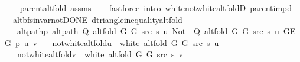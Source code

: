 \begin{isabellebody}
\endisataginvisible
{\isafoldinvisible}%
%
\isadeliminvisible
\isanewline
%
\endisadeliminvisible
%
\isadelimproof
\ \ %
\endisadelimproof
%
\isatagproof
{}\isamarkupfalse%
\ parent{\isacharunderscore}{\kern0pt}alt{\isacharunderscore}{\kern0pt}fold\ assms\isanewline
\ \ \isamarkupfalse%
\ {\isacharparenleft}{\kern0pt}fastforce\ intro{\isacharcolon}{\kern0pt}\ white{\isacharunderscore}{\kern0pt}not{\isacharunderscore}{\kern0pt}white{\isacharunderscore}{\kern0pt}alt{\isacharunderscore}{\kern0pt}foldD{\isacharparenleft}{\kern0pt}{}{\isacharparenright}{\kern0pt}\ parent{\isacharunderscore}{\kern0pt}imp{\isacharunderscore}{\kern0pt}d{\isacharparenright}{\kern0pt}%
\endisatagproof
{\isafoldproof}%
%
\isadelimproof
\isanewline
%
\endisadelimproof
\isanewline
{}\isamarkupfalse%
\ {\isacharparenleft}{\kern0pt}\ alt{\isacharunderscore}{\kern0pt}bfs{\isacharunderscore}{\kern0pt}invar{\isacharunderscore}{\kern0pt}not{\isacharunderscore}{\kern0pt}DONE{\isacharparenright}{\kern0pt}\ d{\isacharunderscore}{\kern0pt}triangle{\isacharunderscore}{\kern0pt}inequality{\isacharunderscore}{\kern0pt}alt{\isacharunderscore}{\kern0pt}fold{\isacharcolon}{\kern0pt}\isanewline
\ \ \ alt{\isacharunderscore}{\kern0pt}path{\isacharunderscore}{\kern0pt}p{\isacharcolon}{\kern0pt}\ {\isachardoublequoteopen}alt{\isacharunderscore}{\kern0pt}path\ {\isacharparenleft}{\kern0pt}Q\ {\isacharparenleft}{\kern0pt}alt{\isacharunderscore}{\kern0pt}fold\ G{}\ G{}\ src\ s{\isacharparenright}{\kern0pt}\ u{\isacharparenright}{\kern0pt}\ {\isacharparenleft}{\kern0pt}Not\ {\isasymcirc}\ Q\ {\isacharparenleft}{\kern0pt}alt{\isacharunderscore}{\kern0pt}fold\ G{}\ G{}\ src\ s{\isacharparenright}{\kern0pt}\ u{\isacharparenright}{\kern0pt}\ {\isacharparenleft}{\kern0pt}G{\isachardot}{\kern0pt}E\ G{\isacharparenright}{\kern0pt}\ p\ u\ v{\isachardoublequoteclose}\isanewline
\ \ \ not{\isacharunderscore}{\kern0pt}white{\isacharunderscore}{\kern0pt}alt{\isacharunderscore}{\kern0pt}fold{\isacharunderscore}{\kern0pt}u{\isacharcolon}{\kern0pt}\ {\isachardoublequoteopen}{\isasymnot}\ white\ {\isacharparenleft}{\kern0pt}alt{\isacharunderscore}{\kern0pt}fold\ G{}\ G{}\ src\ s{\isacharparenright}{\kern0pt}\ u{\isachardoublequoteclose}\isanewline
\ \ \ not{\isacharunderscore}{\kern0pt}white{\isacharunderscore}{\kern0pt}alt{\isacharunderscore}{\kern0pt}fold{\isacharunderscore}{\kern0pt}v{\isacharcolon}{\kern0pt}\ {\isachardoublequoteopen}{\isasymnot}\ white\ {\isacharparenleft}{\kern0pt}alt{\isacharunderscore}{\kern0pt}fold\ G{}\ G{}\ src\ s{\isacharparenright}{\kern0pt}\ v{\isachardoublequoteclose}\isanewline

\end{isabellebody}
